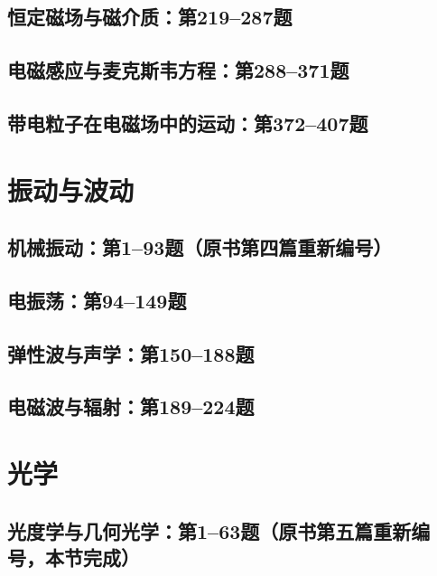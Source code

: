 \documentclass[lang=cn,color=blue,11pt]{elegantbook}
\begin{document}
\section{恒定磁场与磁介质：第219--287题}





\section{电磁感应与麦克斯韦方程：第288--371题}





\section{带电粒子在电磁场中的运动：第372--407题}


\chapter{振动与波动}
\section{机械振动：第1--93题（原书第四篇重新编号）}






\section{电振荡：第94--149题}




\section{弹性波与声学：第150--188题}



\section{电磁波与辐射：第189--224题}



\chapter{光学}
\section{光度学与几何光学：第1--63题（原书第五篇重新编号，本节完成）}

\end{document}
